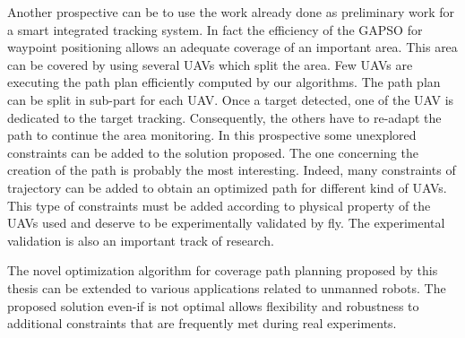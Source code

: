 Another prospective can be to use the work already done as preliminary work for a smart integrated tracking system. In	fact the efficiency of the GAPSO  for waypoint positioning allows an adequate coverage of an important area. This area can be covered by using several UAVs which split the area. Few UAVs are executing the path plan efficiently computed by our algorithms. The path plan can be split in sub-part for each UAV. Once a target detected, one of the UAV is dedicated to the target tracking. Consequently, the others have to re-adapt the path to continue the area monitoring. In this prospective some unexplored constraints can be added to the solution proposed.
The one concerning the creation of the path is probably the most interesting.  Indeed, many constraints of trajectory can be added to obtain an optimized path for different kind of UAVs. This type of constraints must be added according to physical property of the UAVs used and deserve to be experimentally validated by fly. 
The experimental validation is also an important track of research. %




The novel optimization algorithm for coverage path planning proposed by this thesis can be extended to various applications related to unmanned robots. The proposed solution even-if is not optimal allows flexibility and robustness  to additional constraints  that are frequently  met during real experiments.




